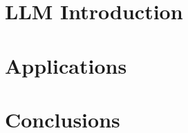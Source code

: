 \section[LLM]{LLM Introduction}


% 

% 

\section[Apps]{Applications}


\section[Concl]{Conclusions}

